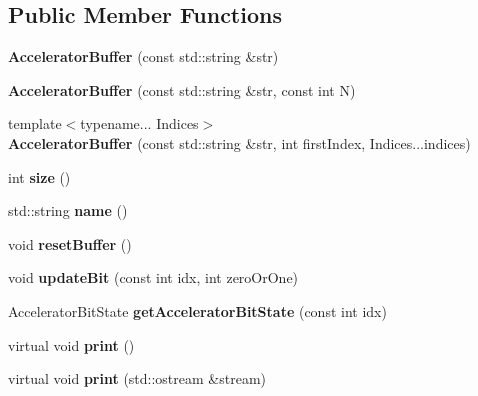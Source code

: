 \subsection*{Public Member Functions}
\begin{DoxyCompactItemize}
\item 
{\bfseries Accelerator\+Buffer} (const std\+::string \&str)\hypertarget{a00032_a5115079c3f3f8d32e713f78a91c93a7a}{}\label{a00032_a5115079c3f3f8d32e713f78a91c93a7a}

\item 
{\bfseries Accelerator\+Buffer} (const std\+::string \&str, const int N)\hypertarget{a00032_a6947082735241791c5170d677042da4a}{}\label{a00032_a6947082735241791c5170d677042da4a}

\item 
{\footnotesize template$<$typename... Indices$>$ }\\{\bfseries Accelerator\+Buffer} (const std\+::string \&str, int first\+Index, Indices...\+indices)\hypertarget{a00032_afe8b2a7e0b7b7992f45fe7021d106b66}{}\label{a00032_afe8b2a7e0b7b7992f45fe7021d106b66}

\item 
int {\bfseries size} ()\hypertarget{a00032_a249eae9f3b83072e5b101ba23f900e81}{}\label{a00032_a249eae9f3b83072e5b101ba23f900e81}

\item 
std\+::string {\bfseries name} ()\hypertarget{a00032_a3373218e4d430d061ba75135bf14ede3}{}\label{a00032_a3373218e4d430d061ba75135bf14ede3}

\item 
void {\bfseries reset\+Buffer} ()\hypertarget{a00032_aa5080c9a975871858b39d3394e867e77}{}\label{a00032_aa5080c9a975871858b39d3394e867e77}

\item 
void {\bfseries update\+Bit} (const int idx, int zero\+Or\+One)\hypertarget{a00032_a689855524e630049db6120a1493a3c45}{}\label{a00032_a689855524e630049db6120a1493a3c45}

\item 
Accelerator\+Bit\+State {\bfseries get\+Accelerator\+Bit\+State} (const int idx)\hypertarget{a00032_a29ece4f7b671308b89c06f3ac8e74b9e}{}\label{a00032_a29ece4f7b671308b89c06f3ac8e74b9e}

\item 
virtual void {\bfseries print} ()\hypertarget{a00032_a3776733a3196bca276988d4cc50a135a}{}\label{a00032_a3776733a3196bca276988d4cc50a135a}

\item 
virtual void {\bfseries print} (std\+::ostream \&stream)\hypertarget{a00032_a6f2cf905960a528fc829904a3c176c6e}{}\label{a00032_a6f2cf905960a528fc829904a3c176c6e}

\end{DoxyCompactItemize}
